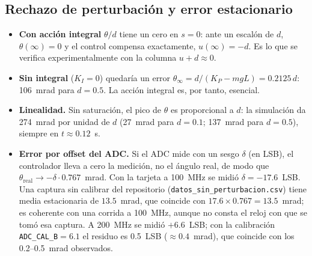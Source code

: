 \documentclass[11pt,a4paper]{article}
\begin{document}
\subsection{Rechazo de perturbaci\'on y error estacionario}
\begin{itemize}[leftmargin=1.6em]
\item \textbf{Con acci\'on integral} $\theta/d$ tiene un cero en $s=0$: ante un escal\'on de $d$,
$\theta(\infty)=0$ y el control compensa exactamente, $u(\infty)=-d$. Es lo que se verifica
experimentalmente con la columna $u+d\approx0$.
\item \textbf{Sin integral} ($K_I=0$) quedar\'ia un error $\theta_\infty=d/(K_P-mgL)=0.2125\,d$:
106~mrad para $d=0.5$. La acci\'on integral es, por tanto, esencial.
\item \textbf{Linealidad.} Sin saturaci\'on, el pico de $\theta$ es proporcional a $d$: la simulaci\'on da
274~mrad por unidad de $d$ (27~mrad para $d=0.1$; 137~mrad para $d=0.5$), siempre en $t\approx0.12$~s.
\item \textbf{Error por offset del ADC.} Si el ADC mide con un sesgo $\delta$ (en LSB), el
controlador lleva a cero la medici\'on, no el \'angulo real, de modo que $\theta_{\mathrm{real}}\to-\delta\cdot0.767$~mrad.
Con la tarjeta a 100~MHz se midi\'o $\delta=-17.6$~LSB. Una captura sin calibrar del repositorio (\texttt{datos\_sin\_perturbacion.csv}) tiene media estacionaria de $13.5$~mrad, que coincide con $17.6\times0.767=13.5$~mrad; es coherente con una corrida a 100~MHz, aunque no consta el reloj con que se tom\'o esa captura. A 200~MHz
se midi\'o $+6.6$~LSB; con la calibraci\'on \texttt{ADC\_CAL\_B}$=6.1$ el residuo es
0.5~LSB ($\approx0.4$~mrad), que coincide con los 0.2--0.5~mrad observados.
\end{itemize}
\end{document}
